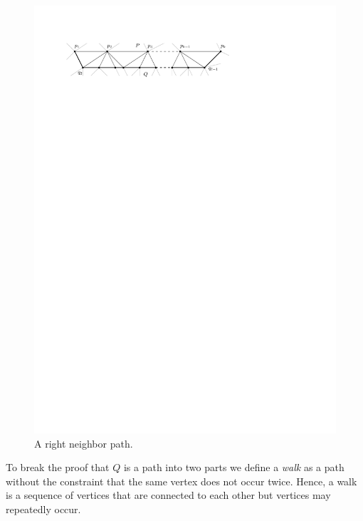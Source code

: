     \begin{figure}[h]
      \centering
      \includegraphics[scale=1]{unifiedAlgo/img/rightNeighbourwalk/neighborPath.pdf}
      \caption{A right neighbor path.}
      \label{fig:right:neighborPath}
    \end{figure}

    To break the proof that $Q$ is a path into two parts we define a \emph{walk} as a path without the constraint that the same vertex does not occur twice. Hence, a walk is a sequence of vertices that are connected to each other but vertices may repeatedly occur.

